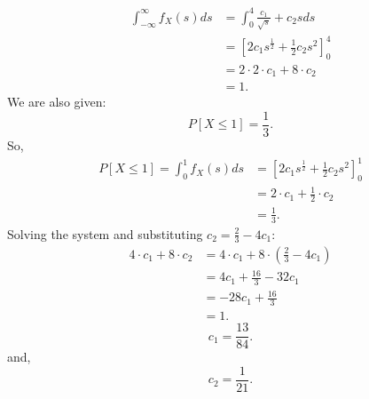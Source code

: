 \documentclass[a4paper]{article}
\begin{document}
\begin{enumerate}
\begin{note}
        \begin{align*}
          \int_{-\infty}^{\infty}  f_X(s) ds &= \int_{0}^{4} \frac{c_1}{\sqrt{s}} + c_{2}s ds\\
                                             &= [2 c_1 s^{\frac{1}{2}} + \frac{1}{2}c_2 s^2]_0^4 \\
                                             &= 2 \cdot 2 \cdot c_1 + 8 \cdot c_2 \\
                                             &= 1
        .\end{align*}
        We are also given:
        \[
          P[X \leq 1] = \frac{1}{3} 
        .\] 
        So,
        \begin{align*}
          P[X \leq 1] = \int_{0}^1 f_X(s) ds &= [2 c_1 s^{\frac{1}{2}} + \frac{1}{2}c_2 s^2]_0^1 \\
                                             &= 2 \cdot c_1 + \frac{1}{2} \cdot c_2 \\
                                             &= \frac{1}{3}
        .\end{align*}
        Solving the system and substituting $c_2 = \frac{2}{3} - 4 c_1$:
        \begin{align*}
          4 \cdot c_1 + 8 \cdot c_2 &= 4 \cdot c_1 + 8 \cdot (\frac{2}{3} - 4c_1) \\
                                    &= 4c_1 + \frac{16}{3} - 32c_1 \\
                                    &= -28c_1 + \frac{16}{3} \\
                                    &= 1
        .\end{align*}
        \[
        c_1 = \frac{13}{84}
        .\] 
        and,
        \[
        c_2 =\frac{1}{21}
        .\]      


\end{note}
\end{enumerate}
\end{document}
